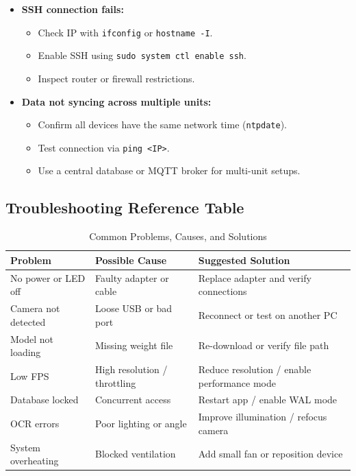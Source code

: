 \begin{itemize}
	\item \textbf{SSH connection fails:}
	\begin{itemize}
		\item Check IP with \texttt{ifconfig} or \texttt{hostname -I}.  
		\item Enable SSH using \texttt{sudo system ctl enable ssh}.  
		\item Inspect router or firewall restrictions.
	\end{itemize}
	
	\item \textbf{Data not syncing across multiple units:}
	\begin{itemize}
		\item Confirm all devices have the same network time (\texttt{ntpdate}).  
		\item Test connection via \texttt{ping <IP>}.  
		\item Use a central database or MQTT broker for multi-unit setups.
	\end{itemize}
\end{itemize}

\subsection*{Troubleshooting Reference Table}

\begin{table}[h!]
	\centering
	\caption{Common Problems, Causes, and Solutions}
	\renewcommand{\arraystretch}{1.3}
	\begin{tabular}{|p{3.5cm}|p{4cm}|p{6cm}|}
		\hline
		\textbf{Problem} & \textbf{Possible Cause} & \textbf{Suggested Solution} \\ \hline
		No power or LED off & Faulty adapter or cable & Replace adapter and verify connections \\ \hline
		Camera not detected & Loose USB or bad port & Reconnect or test on another PC \\ \hline
		Model not loading & Missing weight file & Re-download or verify file path \\ \hline
		Low FPS & High resolution / throttling & Reduce resolution / enable performance mode \\ \hline
		Database locked & Concurrent access & Restart app / enable WAL mode \\ \hline
		OCR errors & Poor lighting or angle & Improve illumination / refocus camera \\ \hline
		System overheating & Blocked ventilation & Add small fan or reposition device \\ \hline
	\end{tabular}
\end{table}

